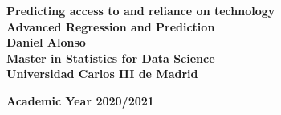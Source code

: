\documentclass[a4paper,12pt]{article}
\begin{document}
	
		\begin{titlepage}
		\begin{center}
		\textbf{\LARGE Predicting access to and reliance on technology}\\[0.65 cm]
		\textbf{\LARGE Advanced Regression and Prediction}\\[5 cm]
		
        \textbf{\large Daniel Alonso}\\[0.8cm]
        \textbf{\large Master in Statistics for Data Science}\\[0.3 cm]
        \textbf{\large Universidad Carlos III de Madrid}\\[1.5 cm]
        \begin{figure}[H]
		    \centering
		\end{figure}
		\textbf{Academic Year 2020/2021}    
		\end{center}
	    \end{titlepage} 
\end{document}
